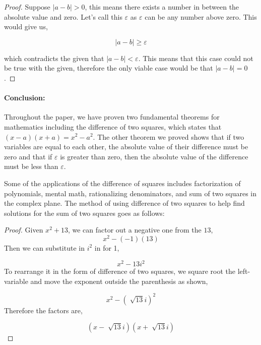 \documentclass[a4paper, 12pt]{article}
\begin{document}
\begin{proof}
Suppose \(|a-b| > 0\), this means there exists a number in between the absolute value and zero. Let's call this \(\varepsilon\) as \(\varepsilon\) can be any number above zero. This would give us, 

\begin{equation}
|a-b| \geq \varepsilon
\end{equation}

which contradicts the given that \(|a-b| < \varepsilon\). This means that this case could not be true with the given, therefore the only viable case would be that \(|a-b| = 0\).

\end{proof}

\paragraph{Conclusion:} Throughout the paper, we have proven two fundamental theorems for mathematics including the difference of two squares, which states that \((x-a)(x+a) = {x}^{2} - {a}^{2} \). The other theorem we proved shows that if two variables are equal to each other, the absolute value of their difference must be zero and that if \(\varepsilon\) is greater than zero, then the absolute value of the difference must be less than $\varepsilon$.

Some of the applications of the difference of squares includes factorization of polynomials, mental math, rationalizing denominators, and sum of two squares in the complex plane. The method of using difference of two squares to help find solutions for the sum of two squares goes as follows:

\begin{proof}
Given \({x}^{2} + 13\), we can factor out a negative one from the \(13\),
\begin{equation}
x^2 - (-1)(13)
\end{equation}
Then we can substitute in \(i^2\) in for 1,

\begin{equation}
x^2 - 13i^2
\end{equation}
To rearrange it in the form of difference of two squares, we square root the left-variable and move the exponent outside the parenthesis as shown, 

\begin{equation}
x^2 - (\sqrt[]{13} i)^2
\end{equation}
Therefore the factors are, 

\begin{equation}
(x-\sqrt[]{13}i)(x+\sqrt[]{13}i)
\end{equation}

\end{proof}
\end{document}
